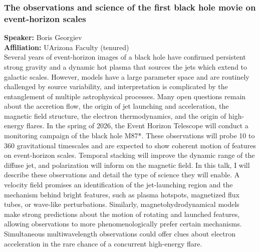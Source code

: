 \hypertarget{abs-27}{}
\subsubsection*{The observations and science of the first black hole movie on event-horizon scales}
\textbf{Speaker:} Boris Georgiev \\
\textbf{Affiliation:} UArizona \textperiodcentered{} Faculty (tenured)\\
Several years of event-horizon images of a black hole have confirmed persistent strong gravity and a dynamic hot plasma that sources the jets which extend to galactic scales. However, models have a large parameter space and are routinely challenged by source variability, and interpretation is complicated by the entanglement of multiple astrophysical processes. Many open questions remain about the accretion flow, the origin of jet launching and acceleration, the magnetic field structure, the electron thermodynamics, and the origin of high-energy flares. In the spring of 2026, the Event Horizon Telescope will conduct a monitoring campaign of the black hole M87*. These observations will probe 10 to 360 gravitational timescales and are expected to show coherent motion of features on event-horizon scales. Temporal stacking will improve the dynamic range of the diffuse jet, and polarization will inform on the magnetic field. In this talk, I will describe these observations and detail the type of science they will enable. A velocity field promises an identification of the jet-launching region and the mechanism behind bright features, such as plasma hotspots, magnetized flux tubes, or wave-like perturbations. Similarly, magnetohydrodynamical models make strong predictions about the motion of rotating and launched features, allowing observations to more phenomenologically prefer certain mechanisms. Simultaneous multiwavelength observations could offer clues about electron acceleration in the rare chance of a concurrent high-energy flare.

\hypertarget{abs-28}{}
